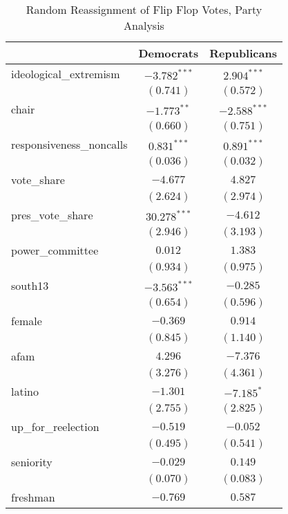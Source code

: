 \documentclass[12pt]{article}
\begin{document}
\begin{table}
	\begin{center}
		\caption{Random Reassignment of Flip Flop Votes, Party Analysis}
		\begin{tabular}{l c c }
			\hline
			& Democrats & Republicans \\
			\hline
			ideological\_extremism   & $-3.782^{***}$ & $2.904^{***}$  \\
			& $(0.741)$      & $(0.572)$      \\
			chair                    & $-1.773^{**}$  & $-2.588^{***}$ \\
			& $(0.660)$      & $(0.751)$      \\
			responsiveness\_noncalls & $0.831^{***}$  & $0.891^{***}$  \\
			& $(0.036)$      & $(0.032)$      \\
			vote\_share              & $-4.677$       & $4.827$        \\
			& $(2.624)$      & $(2.974)$      \\
			pres\_vote\_share        & $30.278^{***}$ & $-4.612$       \\
			& $(2.946)$      & $(3.193)$      \\
			power\_committee         & $0.012$        & $1.383$        \\
			& $(0.934)$      & $(0.975)$      \\
			south13                  & $-3.563^{***}$ & $-0.285$       \\
			& $(0.654)$      & $(0.596)$      \\
			female                   & $-0.369$       & $0.914$        \\
			& $(0.845)$      & $(1.140)$      \\
			afam                     & $4.296$        & $-7.376$       \\
			& $(3.276)$      & $(4.361)$      \\
			latino                   & $-1.301$       & $-7.185^{*}$   \\
			& $(2.755)$      & $(2.825)$      \\
			up\_for\_reelection      & $-0.519$       & $-0.052$       \\
			& $(0.495)$      & $(0.541)$      \\
			seniority                & $-0.029$       & $0.149$        \\
			& $(0.070)$      & $(0.083)$      \\
			freshman                 & $-0.769$       & $0.587$        \\

\end{tabular}
\end{center}
\end{table}
\end{document}
